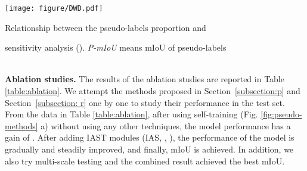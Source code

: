 \documentclass[runningheads]{llncs}
\begin{document}
\makeatletter{}\makeatother
\begin{minipage}{.50\textwidth}
\texttt{[image: figure/DWD.pdf]}
\caption{Relationship between the pseudo-labels proportion and }
\label{fig:dwd} 
\end{minipage}
\makeatletter{}\makeatother
\begin{minipage}{.38\textwidth}
\centering
\caption{ sensitivity analysis (). \emph{P-mIoU} means mIoU of pseudo-labels}
\label{tab:gamma}
\end{minipage}

~\\
\noindent\textbf{Ablation studies.} The results of the ablation studies are reported in Table \ref{table:ablation}. We attempt the methods proposed in Section~\ref{subsection:p} and Section~\ref{subsection: r} one by one to study their performance in the test set. From the data in Table \ref{table:ablation}, after using self-training (Fig. \ref{fig:pseudo-methods} a) without using any other techniques, the model performance has a gain of . After adding IAST modules (IAS, , ), the performance of the model is gradually and steadily improved, and finally,  mIoU is achieved. In addition, we also try multi-scale testing and the combined result achieved the best  mIoU.

\begin{table}[htb!]
\centering
\caption{Results of ablation study (GTA5 to Cityscapes)}
\label{table:ablation}
\end{table}
\end{document}
